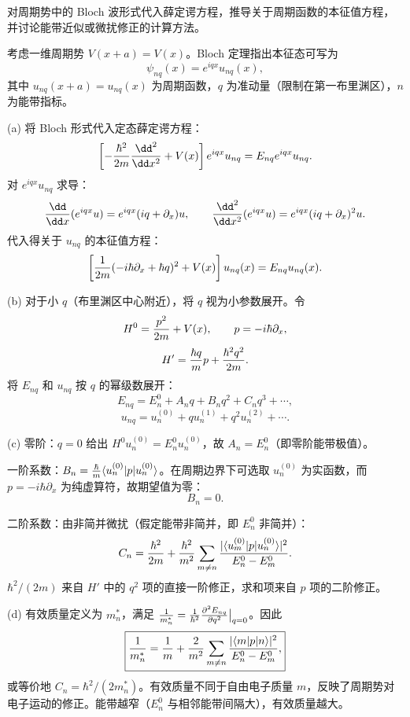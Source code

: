 \begin{question}
对周期势中的 Bloch 波形式代入薛定谔方程，推导关于周期函数的本征值方程，并讨论能带近似或微扰修正的计算方法。
\end{question}
\begin{solution}
考虑一维周期势 $V(x+a)=V(x)$。Bloch 定理指出本征态可写为
\[
\psi_{nq}(x) = e^{iqx} u_{nq}(x),
\]
其中 $u_{nq}(x+a)=u_{nq}(x)$ 为周期函数，$q$ 为准动量（限制在第一布里渊区），$n$ 为能带指标。

(a) 将 Bloch 形式代入定态薛定谔方程：
\[
\left[-{\hbar^2\over2m}{\dd^2\over\dd x^2} + V(x)\right] e^{iqx}u_{nq} = E_{nq} e^{iqx}u_{nq}.
\]
对 $e^{iqx}u_{nq}$ 求导：
\[
{\dd\over\dd x}(e^{iqx}u) = e^{iqx}(iq + \partial_x)u,
\qquad
{\dd^2\over\dd x^2}(e^{iqx}u) = e^{iqx}(iq+\partial_x)^2u.
\]
代入得关于 $u_{nq}$ 的本征值方程：
\[
\left[{1\over2m}(-i\hbar\partial_x + \hbar q)^2 + V(x)\right]u_{nq}(x) = E_{nq} u_{nq}(x).
\]

(b) 对于小 $q$（布里渊区中心附近），将 $q$ 视为小参数展开。令
\[
H^0 = {p^2\over2m} + V(x),\qquad p = -i\hbar\partial_x,
\]
\[
H' = {\hbar q\over m}p + {\hbar^2 q^2\over2m}.
\]
将 $E_{nq}$ 和 $u_{nq}$ 按 $q$ 的幂级数展开：
\[
E_{nq} = E_n^0 + A_n q + B_n q^2 + C_n q^3 + \cdots,
\]
\[
u_{nq} = u_n^{(0)} + q u_n^{(1)} + q^2 u_n^{(2)} + \cdots.
\]

(c) 零阶：$q=0$ 给出 $H^0 u_n^{(0)} = E_n^0 u_n^{(0)}$，故 $A_n = E_n^0$（即零阶能带极值）。

一阶系数：$B_n = {\hbar\over m}\langle u_n^{(0)}|p|u_n^{(0)}\rangle$。在周期边界下可选取 $u_n^{(0)}$ 为实函数，而 $p=-i\hbar\partial_x$ 为纯虚算符，故期望值为零：
\[
B_n = 0.
\]

二阶系数：由非简并微扰（假定能带非简并，即 $E_n^0$ 非简并）：
\[
C_n = {\hbar^2\over2m} + {\hbar^2\over m^2}\sum_{m\ne n}{|\langle u_m^{(0)}|p|u_n^{(0)}\rangle|^2\over E_n^0 - E_m^0}.
\]
${\hbar^2/(2m)}$ 来自 $H'$ 中的 $q^2$ 项的直接一阶修正，求和项来自 $p$ 项的二阶修正。

(d) 有效质量定义为 $m_n^*$，满足 ${1\over m_n^*} = {1\over\hbar^2}{\partial^2 E_{nq}\over\partial q^2}\big|_{q=0}$。因此
\[
\boxed{{1\over m_n^*} = {1\over m} + {2\over m^2}\sum_{m\ne n}{|\langle m|p|n\rangle|^2\over E_n^0 - E_m^0},}
\]
或等价地 $\boxed{C_n = \hbar^2/(2m_n^*)}$。有效质量不同于自由电子质量 $m$，反映了周期势对电子运动的修正。能带越窄（$E_n^0$ 与相邻能带间隔大），有效质量越大。
\end{solution}
